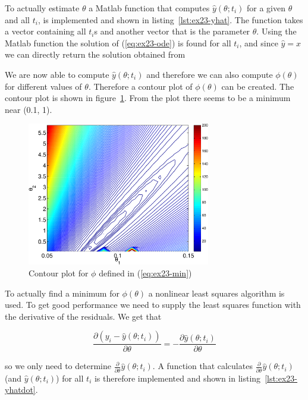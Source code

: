 To actually estimate $\theta$ a Matlab function that computes $\hat{y}(\theta; t_i)$ for a given $\theta$ and all $t_i$, is implemented and shown in listing~\ref{lst:ex23-yhat}. The function takes a vector  containing all $t_i$s and another vector  that is the parameter $\theta$. Using the Matlab function  the solution of (\ref{eq:ex23-ode}) is found for all $t_i$, and since $\hat{y}=x$ we can directly return the solution obtained from 



We are now able to compute $\hat{y}(\theta; t_i)$ and therefore we can also compute $\phi(\theta)$ for different values of $\theta$. Therefore a contour plot of $\phi(\theta)$ can be created. The contour plot is shown in figure~\ref{fig:ex23-contour}. From the plot there seems to be a minimum near (0.1, 1).

\begin{figure}[ht]
    \centering
    \includegraphics[width=80mm]{../media/ex23-contour.pdf}
    \caption{Contour plot for $\phi$ defined in (\ref{eq:ex23-min})}
    \label{fig:ex23-contour}
\end{figure}

To actually find a minimum for $\phi(\theta)$ a nonlinear least squares algorithm is used. To get good performance we need to supply the least squares function with the derivative of the residuals. We get that 

\begin{equation*}
    \frac{\partial (y_i - \hat{y}(\theta;t_i))}{\partial\theta}=-\frac{\partial\hat{y}(\theta; t_i)}{\partial\theta}
\end{equation*}

so we only need to determine $\frac{\partial}{\partial\theta}\hat{y}(\theta;t_i)$. A function that calculates $\frac{\partial}{\partial\theta}\hat{y}(\theta;t_i)$ (and $\hat{y}(\theta;t_i)$) for all $t_i$ is therefore implemented and shown in listing~\ref{lst:ex23-yhatdot}.

